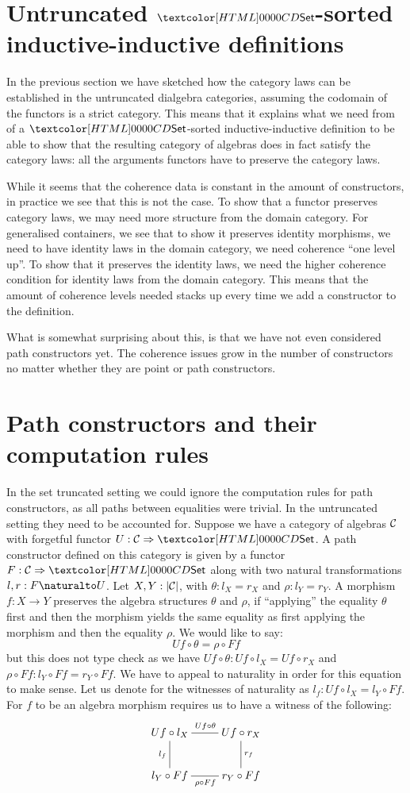 \section{Untruncated $\Set$-sorted inductive-inductive definitions}

In the previous section we have sketched how the category laws can be
established in the untruncated dialgebra categories, assuming the
codomain of the functors is a strict category. This means that it
explains what we need from of a $\Set$-sorted inductive-inductive
definition to be able to show that the resulting category of algebras
does in fact satisfy the category laws: all the arguments functors
have to preserve the category laws.

While it seems that the coherence data is constant in the amount of
constructors, in practice we see that this is not the case. To show
that a functor preserves category laws, we may need more structure
from the domain category. For generalised containers, we see that to
show it preserves identity morphisms, we need to have identity laws in
the domain category, \ie we need coherence ``one level up''. To show
that it preserves the identity laws, we need the higher coherence
condition for identity laws from the domain category. This means that
the amount of coherence levels needed stacks up every time we add a
constructor to the definition.

What is somewhat surprising about this, is that we have not even
considered path constructors yet. The coherence issues grow in the
number of constructors no matter whether they are point or path
constructors.

\section{Path constructors and their computation rules}

In the set truncated setting we could ignore the computation rules for
path constructors, as all paths between equalities were trivial. In
the untruncated setting they need to be accounted for. Suppose we have
a category of algebras $\mathcal{C}$ with forgetful functor
$U : \Func{\Cc}{\Set}$. A path constructor defined on this category is
given by a functor $F : \Func{\Cc}{\Set}$ along with two natural
transformations $l,r : \Nat{F}{U}$. Let $X, Y : | \mathcal{C} |$, with
$\theta : l_X = r_X$ and $\rho : l_Y = r_Y$. A morphism $f : X \to Y$
preserves the algebra structures $\theta$ and $\rho$, if ``applying''
the equality $\theta$ first and then the morphism yields the same
equality as first applying the morphism and then the equality
$\rho$. We would like to say:
$$
U f \circ \theta = \rho \circ F f
$$
but this does not type check as we have
$U f \circ \theta : U f \circ l_X = U f \circ r_X$ and
$\rho \circ Ff : l_Y \circ F f = r_Y \circ F f$. We have to appeal to
naturality in order for this equation to make sense. Let us denote for
the witnesses of naturality as $l_f : Uf \circ l_X = l_Y \circ
Ff$.
For $f$ to be an algebra morphism requires us to have a witness of the
following:
$$
\xymatrix{
U f \circ l_X
\ar@{-}[r]^{U f \circ \theta}
\ar@{-}[d]_{l_f}
&U f \circ r_X
\ar@{-}[d]^{r_f}
\\
l_Y \circ Ff
\ar@{-}[r]_{\rho \circ Ff}
&r_Y \circ Ff
}
$$
